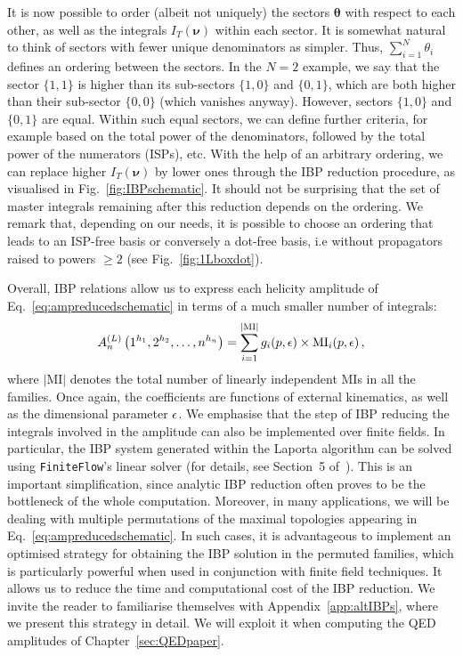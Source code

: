 \documentclass[main.tex]{subfiles}
\begin{document}
It is now possible to order (albeit not uniquely) the sectors $\bm{\theta}$ with respect to each other, as well as the integrals $I_T(\bm{\nu})$ within each sector. It is somewhat natural to think of sectors with fewer unique denominators as simpler. Thus, $\sum_{i=1}^N \theta_i$ defines an ordering between the sectors. In the $N=2$ example, we say that the sector $\{1, 1\}$ is higher than its sub-sectors $\{1, 0\}$ and $\{0, 1\}$, which are both higher than their sub-sector $\{0, 0\}$ (which vanishes anyway). However, sectors $\{1, 0\}$ and $\{0, 1\}$ are equal. Within such equal sectors, we can define further criteria, for example based on the total power of the denominators, followed by the total power of the numerators (ISPs), etc. With the help of an arbitrary ordering, we can replace higher $I_T(\bm{\nu})$ by lower ones through the IBP reduction procedure, as visualised in Fig.~\ref{fig:IBPschematic}. It should not be surprising that the set of master integrals remaining after this reduction depends on the ordering. We remark that, depending on our needs, it is possible to choose an ordering that leads to an ISP-free basis or conversely a dot-free basis, i.e without propagators raised to powers $\ge 2$ (see Fig.~\ref{fig:1Lboxdot}).

Overall, IBP relations allow us to express each helicity amplitude of Eq.~\ref{eq:ampreducedschematic} in terms of a much smaller number of integrals:
\begin{equation} \label{eq:ampafterIBP}
    	A_n^{(L)} \left(1^{h_1}, 2^{h_2}, \ldots, n^{h_n} \right) =  
     \sum_{i=1}^{|\text{MI}|} g_i(p, \epsilon) \times \text{MI}_i(p,\epsilon)\,,
\end{equation}
where $|\text{MI}|$ denotes the total number of linearly independent MIs in all the families. Once again, the coefficients are functions of external kinematics, as well as the dimensional parameter $\epsilon$. We emphasise that the step of IBP reducing the integrals involved in the amplitude can also be implemented over finite fields. In particular, the IBP system generated within the Laporta algorithm can be solved using \texttt{FiniteFlow}'s linear solver (for details, see Section~5 of~\cite{Peraro:2019svx}). This is an important simplification, since analytic IBP reduction often proves to be the bottleneck of the whole computation. Moreover, in many applications, we will be dealing with multiple permutations of the maximal topologies appearing in Eq.~\ref{eq:ampreducedschematic}. In such cases, it is advantageous to implement an optimised strategy for obtaining the IBP solution in the permuted families, which is particularly powerful when used in conjunction with finite field techniques. It allows us to reduce the time and computational cost of the IBP reduction. We invite the reader to familiarise themselves with Appendix~\ref{app:altIBPs}, where we present this strategy in detail. We will exploit it when computing the QED amplitudes of Chapter~\ref{sec:QEDpaper}.
\end{document}
